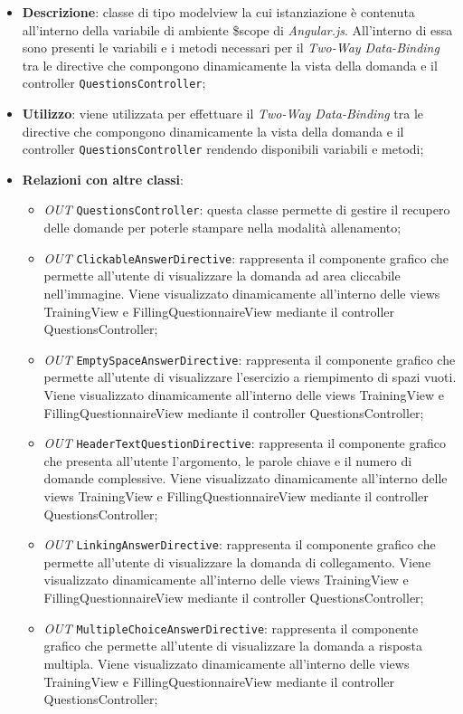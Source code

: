 \begin{itemize}
	\item \textbf{Descrizione}: classe di tipo modelview la cui istanziazione è contenuta all'interno della variabile di ambiente \$scope di \textit{Angular.js}. All'interno di essa sono presenti le variabili e i metodi necessari per il \textit{Two-Way Data-Binding} tra le directive che compongono dinamicamente la vista della domanda e il controller \texttt{QuestionsController};
	\item \textbf{Utilizzo}: viene utilizzata per effettuare il \textit{Two-Way Data-Binding} tra le directive che compongono dinamicamente la vista della domanda e il controller \texttt{QuestionsController} rendendo disponibili variabili e metodi;
	\item \textbf{Relazioni con altre classi}: 
	\begin{itemize} 
		\item \textit{OUT} \texttt{QuestionsController}: questa classe permette di gestire il recupero delle domande per poterle stampare nella modalità allenamento;
		\item \textit{OUT} \texttt{ClickableAnswerDirective}: rappresenta il componente grafico che permette all'utente di visualizzare la domanda ad area cliccabile nell'immagine. Viene visualizzato dinamicamente all'interno delle views TrainingView e FillingQuestionnaireView mediante il controller QuestionsController;
		\item \textit{OUT} \texttt{EmptySpaceAnswerDirective}: rappresenta il componente grafico che permette all'utente di visualizzare l'esercizio a riempimento di spazi vuoti. Viene visualizzato dinamicamente all'interno delle views TrainingView e FillingQuestionnaireView mediante il controller QuestionsController;
		\item \textit{OUT} \texttt{HeaderTextQuestionDirective}: rappresenta il componente grafico che presenta all'utente l'argomento, le parole chiave e il numero di domande complessive. Viene visualizzato dinamicamente all'interno delle views TrainingView e FillingQuestionnaireView mediante il controller QuestionsController;
		\item \textit{OUT} \texttt{LinkingAnswerDirective}: rappresenta il componente grafico che permette all'utente di visualizzare la domanda di collegamento. Viene visualizzato dinamicamente all'interno delle views TrainingView e FillingQuestionnaireView mediante il controller QuestionsController;
		\item \textit{OUT} \texttt{MultipleChoiceAnswerDirective}: rappresenta il componente grafico che permette all'utente di visualizzare la domanda a risposta multipla. Viene visualizzato dinamicamente all'interno delle views TrainingView e FillingQuestionnaireView mediante il controller QuestionsController;

\end{itemize}
\end{itemize}
